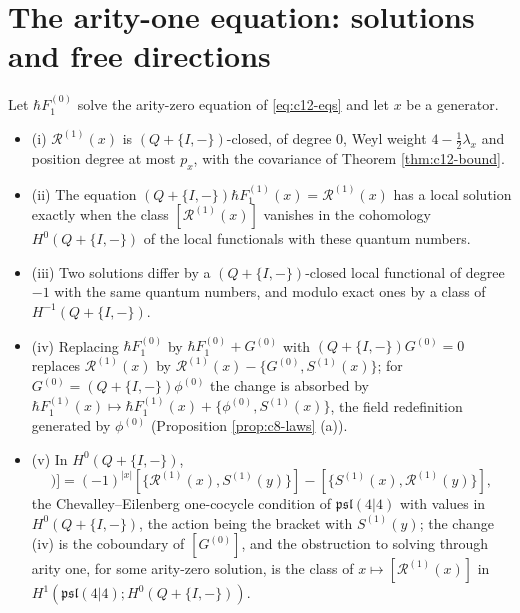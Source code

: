 \section{The arity-one equation: solutions and free directions}

\begin{theorem}
\label{thm:c12-eq1}
Let $\hbar F_1^{(0)}$ solve the arity-zero equation of \eqref{eq:c12-eqs} and let $x$ be a generator.
\begin{itemize}
\item (i) $\mathcal R^{(1)}(x)$ is $(Q+\{I,-\})$-closed, of degree $0$, Weyl weight $4-\tfrac12\lambda_x$ and position degree at most $p_x$, with the covariance of Theorem \ref{thm:c12-bound}.
\item (ii) The equation $(Q+\{I,-\})\hbar F_1^{(1)}(x)=\mathcal R^{(1)}(x)$ has a local solution exactly when the class $[\mathcal R^{(1)}(x)]$ vanishes in the cohomology $H^0(Q+\{I,-\})$ of the local functionals with these quantum numbers.
\item (iii) Two solutions differ by a $(Q+\{I,-\})$-closed local functional of degree $-1$ with the same quantum numbers, and modulo exact ones by a class of $H^{-1}(Q+\{I,-\})$.
\item (iv) Replacing $\hbar F_1^{(0)}$ by $\hbar F_1^{(0)}+G^{(0)}$ with $(Q+\{I,-\})G^{(0)}=0$ replaces $\mathcal R^{(1)}(x)$ by $\mathcal R^{(1)}(x)-\{G^{(0)},S^{(1)}(x)\}$; for $G^{(0)}=(Q+\{I,-\})\phi^{(0)}$ the change is absorbed by $\hbar F_1^{(1)}(x)\mapsto\hbar F_1^{(1)}(x)+\{\phi^{(0)},S^{(1)}(x)\}$, the field redefinition generated by $\phi^{(0)}$ (Proposition \ref{prop:c8-laws} (a)).
\item (v) In $H^0(Q+\{I,-\})$,
\begin{equation}
[\mathcal R^{(1)}([x,y])]=(-1)^{|x|}[\{\mathcal R^{(1)}(x),S^{(1)}(y)\}]-[\{S^{(1)}(x),\mathcal R^{(1)}(y)\}],
\label{eq:c12-cocycle1}
\end{equation}
the Chevalley--Eilenberg one-cocycle condition of $\mathfrak{psl}(4|4)$ with values in $H^0(Q+\{I,-\})$, the action being the bracket with $S^{(1)}(y)$; the change (iv) is the coboundary of $[G^{(0)}]$, and the obstruction to solving through arity one, for some arity-zero solution, is the class of $x\mapsto[\mathcal R^{(1)}(x)]$ in $H^1(\mathfrak{psl}(4|4);H^0(Q+\{I,-\}))$.
\end{itemize}
\end{theorem}

